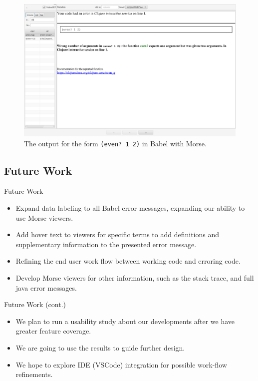 \documentclass{beamer}
\begin{document}
\begin{frame}
  \begin{figure}
    \centering
    \includegraphics[width=\textwidth]{../resources/BabelViewerExample.png}
    \caption{The output for the form \texttt{(even? 1 2)} in Babel with Morse.}
    \label{fig:defaultclj}
  \end{figure}
\end{frame}

\subsection{Future Work}
\begin{frame}{Future Work}
  \begin{itemize}
    \item<1-> Expand data labeling to all Babel error messages, expanding our ability to use Morse viewers.
    \item<2-> Add hover text to viewers for specific terms to add definitions and supplementary information to the presented error message.
    \item<3-> Refining the end user work flow between working code and erroring code.
    \item<4-> Develop Morse viewers for other information, such as the stack trace, and full java error messages.
  \end{itemize}
  \end{frame}

\begin{frame}{Future Work (cont.)}
  \begin{itemize}
    \item<1-> We plan to run a usability study about our developments after we have greater feature coverage.
    \item<2-> We are going to use the results to guide further design.
    \item<3-> We hope to explore IDE (VSCode) integration for possible work-flow refinements.
  \end{itemize}
\end{frame}
\end{document}
